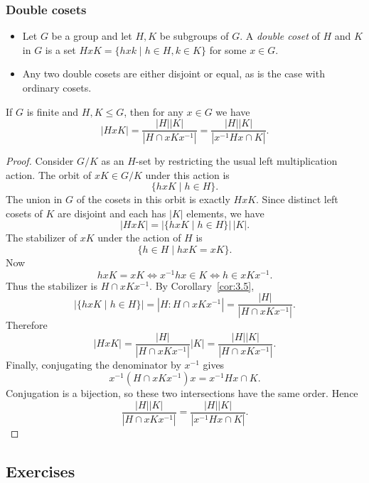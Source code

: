 \documentclass[../Odyssey_Project.tex]{subfiles}
\begin{document}
\subsubsection*{Double cosets}
\begin{itemize}
    \item Let $G$ be a group and let $H, K$ be subgroups of $G$. A \emph{double coset} of $H$ and $K$ in $G$ is a set $HxK = \{hxk \mid h \in H, k \in K\}$ for some $x \in G$.
    \item Any two double cosets are either disjoint or equal, as is the case with ordinary cosets.
\end{itemize}

\begin{proposition}
\label{prop:3.15}
If $G$ is finite and $H, K \leq G$, then for any $x \in G$ we have
\[ |HxK| = \frac{|H||K|}{|H \cap xKx^{-1}|} = \frac{|H||K|}{|x^{-1}Hx \cap K|}. \]
\end{proposition}

\begin{proof}
    Consider $G/K$ as an $H$-set by restricting the usual left multiplication action. The orbit of $xK \in G/K$ under this action is
    \[
        \{hxK \mid h \in H\}.
    \]
    The union in $G$ of the cosets in this orbit is exactly $HxK$. Since distinct left cosets of $K$ are disjoint and each has $|K|$ elements, we have
    \[
        |HxK| = |\{hxK \mid h \in H\}|\,|K|.
    \]
    The stabilizer of $xK$ under the action of $H$ is
    \[
        \{h \in H \mid hxK = xK\}.
    \]
    Now
    \[
        hxK = xK
        \Longleftrightarrow x^{-1}hx \in K
        \Longleftrightarrow h \in xKx^{-1}.
    \]
    Thus the stabilizer is $H \cap xKx^{-1}$. By Corollary~\ref{cor:3.5},
    \[
        |\{hxK \mid h \in H\}| = |H : H \cap xKx^{-1}|
        = \frac{|H|}{|H \cap xKx^{-1}|}.
    \]
    Therefore
    \[
        |HxK|
        = \frac{|H|}{|H \cap xKx^{-1}|}|K|
        = \frac{|H||K|}{|H \cap xKx^{-1}|}.
    \]
    Finally, conjugating the denominator by $x^{-1}$ gives
    \[
        x^{-1}(H \cap xKx^{-1})x = x^{-1}Hx \cap K.
    \]
    Conjugation is a bijection, so these two intersections have the same order. Hence
    \[
        \frac{|H||K|}{|H \cap xKx^{-1}|}
        =
        \frac{|H||K|}{|x^{-1}Hx \cap K|}.
    \]
\end{proof}

\subsection*{Exercises}
\end{document}
